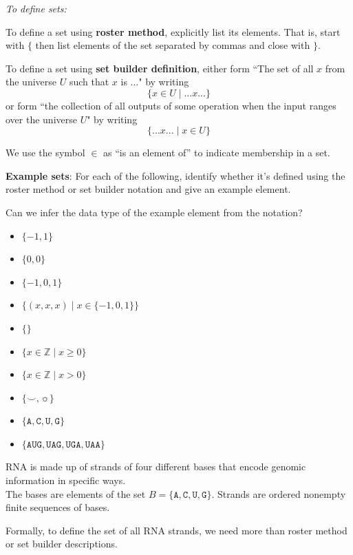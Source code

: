 \documentclass[12pt, oneside]{article}
\newcommand{\A}[0]{\texttt{A}}
\newcommand{\C}[0]{\texttt{C}}
\newcommand{\G}[0]{\texttt{G}}
\newcommand{\U}[0]{\texttt{U}}
\begin{document}
{\it To define sets:}

To define a set using {\bf roster method}, explicitly list its elements. That is,
start with $\{$ then list elements of 
the set separated by commas and close with $\}$.

\vfill

To define a set using {\bf set builder definition}, either form 
``The set of all $x$ from the universe $U$ such that $x$ is ..." by writing
\[\{x \in U \mid ...x... \}\]
or form ``the collection of all outputs of some operation when the input ranges over the universe $U$"
by writing
\[\{ ...x... \mid x\in U \}\]

\vfill

We use the symbol $\in$ as ``is an element of'' to indicate membership in a set.\\

\newpage 

{\bf Example sets}: For each of the following, identify whether it's defined using the roster method
or set builder notation and give an example element.

Can we infer the data type of the example element from the notation?

\begin{itemize}
    \item[]$\{ -1, 1\}$
    \vfill
    \item[]$\{0, 0 \}$
    \vfill
    \item[]$\{-1, 0, 1 \}$
    \vfill
    \item[]$\{(x,x,x) \mid x \in \{-1,0,1\} \}$
    \vfill
    \item[]$\{ \}$
    \vfill
    \item[]$\{ x \in \mathbb{Z} \mid x \geq 0 \}$
    \vfill
    \item[]$\{ x \in \mathbb{Z}  \mid x > 0 \}$
    \vfill
    \item[]$\{ \smile, \sun \}$
    \vfill
    \item[]$\{\A,\C,\U,\G\}$
    \vfill
    \item[]$\{\A\U\G, \U\A\G, \U\G\A, \U\A\A \}$
    \vfill
\end{itemize}
 \newpage


RNA is made up of strands of four different bases that encode genomic information
in specific ways.\\
The bases are elements of the set 
$B  = \{\A, \C, \U, \G \}$.
Strands are ordered nonempty finite sequences of bases.

Formally, to define the set of all RNA strands, we need more than roster
method or set builder descriptions. 
\end{document}
